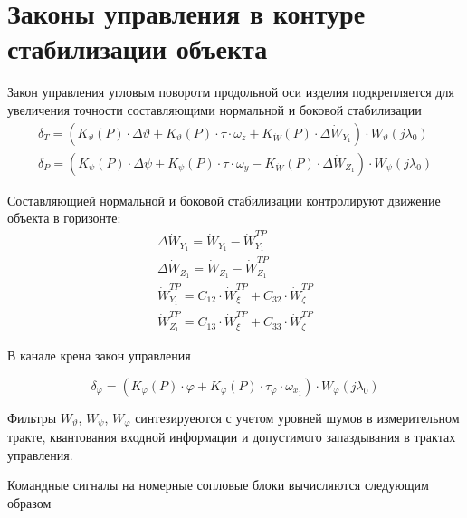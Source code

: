 \section{Законы управления в контуре стабилизации объекта}
Закон управления угловым поворотм продольной оси изделия подкрепляется для увеличения точности составляющими нормальной и боковой стабилизации
\begin{equation}
	\begin{gathered}
		\delta_T = \left( K_\vartheta (P) \cdot \Delta \vartheta + K_\vartheta (P) \cdot \tau \cdot \omega_z + K_{\dot{W}} (P) \cdot \Delta \dot{W}_{Y_1} \right) \cdot W_{\vartheta} (j \lambda_0) \\
		\delta_P = \left( K_\psi (P) \cdot \Delta \psi + K_\psi (P) \cdot \tau \cdot \omega_y - K_{\dot{W}} (P) \cdot \Delta \dot{W}_{Z_1} \right) \cdot W_{\psi} (j \lambda_0)		
	\end{gathered}
\end{equation}

Составляющией нормальной и боковой стабилизации контролируют движение объекта в горизонте:
\begin{equation}
	\begin{gathered}
		\Delta \dot{W}_{Y_1} = \dot{W}_{Y_1} - \dot{W}_{Y_1}^{TP} \\
		\Delta \dot{W}_{Z_1} = \dot{W}_{Z_1} - \dot{W}_{Z_1}^{TP}  \\
		\dot{W}_{Y_1}^{TP} = C_{12} \cdot \dot{W}_{\xi}^{TP} + C_{32} \cdot \dot{W}_{\zeta}^{TP} \\
		\dot{W}_{Z_1}^{TP} = C_{13} \cdot \dot{W}_{\xi}^{TP} + C_{33} \cdot \dot{W}_{\zeta}^{TP}
	\end{gathered}
\end{equation}

В канале крена закон управления

\begin{equation}
	\delta_\varphi = \left( K_\varphi (P) \cdot \varphi + K_\varphi (P) \cdot \tau_\varphi \cdot \omega_{x_1} \right) \cdot W_\varphi (j\lambda_0)
\end{equation}

Фильтры $W_\vartheta$, $W_\psi$, $W_\varphi$ синтезируеются с учетом уровней шумов в измерительном тракте, квантования входной информации и допустимого запаздывания в трактах управления.

Командные сигналы на номерные сопловые блоки вычисляются следующим образом

